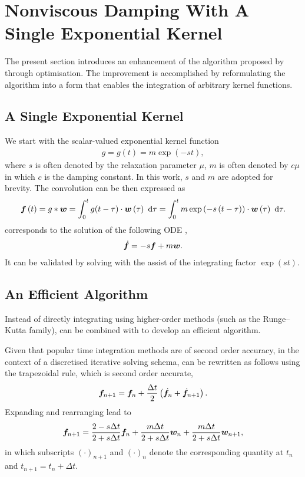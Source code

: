 \section{Nonviscous Damping With A Single Exponential Kernel}
The present section introduces an enhancement of the algorithm proposed by \citet{Adhikari2004} through optimisation. The improvement is accomplished by reformulating the algorithm into a form that enables the integration of arbitrary kernel functions.
\subsection{A Single Exponential Kernel}
We start with the scalar-valued exponential kernel function
\begin{gather}
g=g\left(t\right)=m\exp\left(-st\right),
\end{gather}
where $s$ is often denoted by the relaxation parameter $\mu$, $m$ is often denoted by $c\mu$ in which $c$ is the damping constant. In this work, $s$ and $m$ are adopted for brevity.
The convolution can be then expressed as
\begin{gather}\label{eq:single_conv}
\bm{f}\left(t\right)=g*\bm{w}=\int_0^tg(t-\tau)\cdot\bm{w}\left(\tau\right)~\mathrm{d}\tau=\int_0^tm\exp\left(-s\left(t-\tau\right)\right)\cdot\bm{w}\left(\tau\right)~\mathrm{d}\tau.
\end{gather}
 corresponds to the solution of the following ODE \citep[see, e.g.,][\S~80]{Zwillinger2021},
\begin{gather}\label{eq:single_conv_ode}
\dot{\bm{f}}=-s\bm{f}+m\bm{w}.
\end{gather}
It can be validated by solving  with the assist of the integrating factor $\exp\left(st\right)$.
\subsection{An Efficient Algorithm}
Instead of directly integrating  using higher-order methods (such as the Runge--Kutta family),  can be combined with  to develop an efficient algorithm.

Given that popular time integration methods are of second order accuracy, in the context of a discretised iterative solving schema,  can be rewritten as follows using the trapezoidal rule, which is second order accurate,
\begin{gather}
\bm{f}_{n+1}=\bm{f}_n+\dfrac{\Delta{}t}{2}\left(\dot{\bm{f}}_n+\dot{\bm{f}}_{n+1}\right).
\end{gather}
Expanding and rearranging lead to
\begin{gather}\label{eq:discretised_c}
\bm{f}_{n+1}=\dfrac{2-s\Delta{}t}{2+s\Delta{}t}\bm{f}_n+\dfrac{m\Delta{}t}{2+s\Delta{}t}\bm{w}_n+\dfrac{m\Delta{}t}{2+s\Delta{}t}\bm{w}_{n+1},
\end{gather}
in which subscripts $\left(\cdot\right)_{n+1}$ and $\left(\cdot\right)_n$ denote the corresponding quantity at $t_n$ and $t_{n+1}=t_n+\Delta{}t$.

